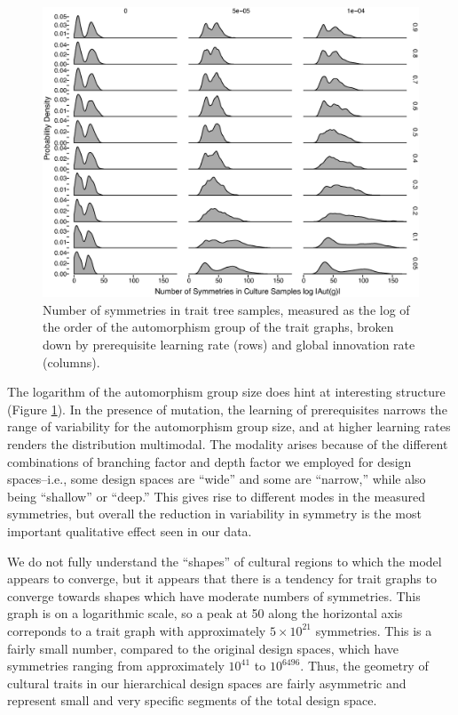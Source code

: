 \begin{figure}[h] 
\centering 
\includegraphics[scale=0.4]{graphics/semanticaxelrod/autgroupsize-by-learning-by-innovation.eps} 
\caption{Number of symmetries in trait tree samples, measured as the log of the order of the automorphism group of the trait graphs, broken down by prerequisite learning rate (rows) and global innovation rate (columns).} 
\label{img:autgsize} 
\end{figure}

The logarithm of the automorphism group size does hint at interesting
structure (Figure \ref{img:autgsize}). In the presence of mutation, the
learning of prerequisites narrows the range of variability for the
automorphism group size, and at higher learning rates renders the
distribution multimodal. The modality arises because of the different
combinations of branching factor and depth factor we employed for design
spaces--i.e., some design spaces are ``wide'' and some are ``narrow,''
while also being ``shallow'' or ``deep.'' This gives rise to different
modes in the measured symmetries, but overall the reduction in
variability in symmetry is the most important qualitative effect seen in
our data.

We do not fully understand the ``shapes'' of cultural regions to which
the model appears to converge, but it appears that there is a tendency
for trait graphs to converge towards shapes which have moderate numbers
of symmetries. This graph is on a logarithmic scale, so a peak at 50
along the horizontal axis correponds to a trait graph with approximately
$5 \times 10^{21}$ symmetries. This is a fairly small number, compared
to the original design spaces, which have symmetries ranging from
approximately $10^{41}$ to $10^{6496}$. Thus, the geometry of cultural
traits in our hierarchical design spaces are fairly asymmetric and
represent small and very specific segments of the total design space.

